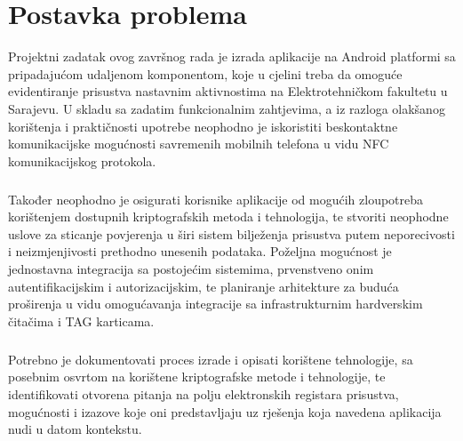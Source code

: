 \chapter{Postavka problema}
Projektni zadatak ovog završnog rada je izrada aplikacije na Android platformi sa pripadajućom udaljenom komponentom, koje u cjelini treba da omoguće evidentiranje prisustva nastavnim aktivnostima na Elektrotehničkom fakultetu u Sarajevu. U skladu sa zadatim funkcionalnim zahtjevima, a iz razloga olakšanog korištenja i praktičnosti upotrebe neophodno je iskoristiti beskontaktne komunikacijske mogućnosti savremenih mobilnih telefona u vidu NFC komunikacijskog protokola.
\paragraph*{}
Također neophodno je osigurati korisnike aplikacije od mogućih zloupotreba korištenjem dostupnih kriptografskih metoda i tehnologija, te stvoriti neophodne uslove za sticanje povjerenja u širi sistem bilježenja prisustva putem neporecivosti i neizmjenjivosti prethodno unesenih podataka. Poželjna mogućnost je jednostavna integracija sa postojećim sistemima, prvenstveno onim autentifikacijskim i autorizacijskim, te planiranje arhitekture za buduća proširenja u vidu omogućavanja integracije sa infrastrukturnim hardverskim čitačima i TAG karticama.
\paragraph*{}
Potrebno je dokumentovati proces izrade i opisati korištene tehnologije, sa posebnim osvrtom na korištene kriptografske metode i tehnologije, te identifikovati otvorena pitanja na polju elektronskih registara prisustva, mogućnosti i izazove koje oni predstavljaju uz rješenja koja navedena aplikacija nudi u datom kontekstu.
